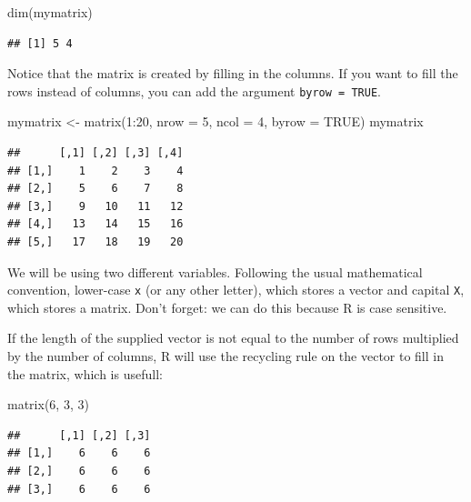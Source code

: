 \documentclass[
]{book}
\newenvironment{Shaded}{\begin{snugshade}}{\end{snugshade}}
\newcommand{\AttributeTok}[1]{\textcolor[rgb]{0.77,0.63,0.00}{#1}}
\newcommand{\ConstantTok}[1]{\textcolor[rgb]{0.00,0.00,0.00}{#1}}
\newcommand{\DecValTok}[1]{\textcolor[rgb]{0.00,0.00,0.81}{#1}}
\newcommand{\FunctionTok}[1]{\textcolor[rgb]{0.00,0.00,0.00}{#1}}
\newcommand{\NormalTok}[1]{#1}
\newcommand{\OtherTok}[1]{\textcolor[rgb]{0.56,0.35,0.01}{#1}}
\newcommand{\SpecialCharTok}[1]{\textcolor[rgb]{0.00,0.00,0.00}{#1}}
\theoremstyle{definition}
\theoremstyle{definition}
\theoremstyle{definition}
\theoremstyle{definition}
\theoremstyle{remark}
\begin{document}
\begin{Shaded}
\begin{Highlighting}[]
\FunctionTok{dim}\NormalTok{(mymatrix)}
\end{Highlighting}
\end{Shaded}

\begin{verbatim}
## [1] 5 4
\end{verbatim}

Notice that the matrix is created by filling in the columns. If you want to fill the rows instead of columns, you can add the argument \texttt{byrow\ =\ TRUE}.

\begin{Shaded}
\begin{Highlighting}[]
\NormalTok{mymatrix }\OtherTok{\textless{}{-}} \FunctionTok{matrix}\NormalTok{(}\DecValTok{1}\SpecialCharTok{:}\DecValTok{20}\NormalTok{, }\AttributeTok{nrow =} \DecValTok{5}\NormalTok{, }\AttributeTok{ncol =} \DecValTok{4}\NormalTok{, }\AttributeTok{byrow =} \ConstantTok{TRUE}\NormalTok{)}
\NormalTok{mymatrix}
\end{Highlighting}
\end{Shaded}

\begin{verbatim}
##      [,1] [,2] [,3] [,4]
## [1,]    1    2    3    4
## [2,]    5    6    7    8
## [3,]    9   10   11   12
## [4,]   13   14   15   16
## [5,]   17   18   19   20
\end{verbatim}

We will be using two different variables. Following the usual mathematical convention, lower-case \texttt{x} (or any other letter), which stores a vector and capital \texttt{X}, which stores a matrix. Don't forget: we can do this because R is case sensitive.

If the length of the supplied vector is not equal to the number of rows multiplied by the number of columns, R will use the recycling rule on the vector to fill in the matrix, which is usefull:

\begin{Shaded}
\begin{Highlighting}[]
\FunctionTok{matrix}\NormalTok{(}\DecValTok{6}\NormalTok{, }\DecValTok{3}\NormalTok{, }\DecValTok{3}\NormalTok{)}
\end{Highlighting}
\end{Shaded}

\begin{verbatim}
##      [,1] [,2] [,3]
## [1,]    6    6    6
## [2,]    6    6    6
## [3,]    6    6    6
\end{verbatim}
\end{document}
